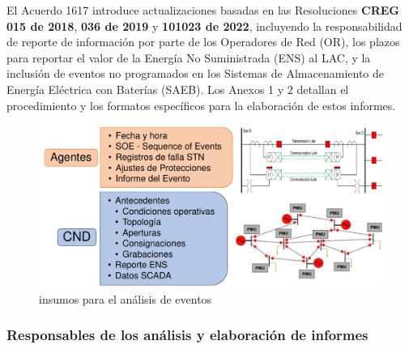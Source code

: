 \documentclass[a5paper]{book}%
\begin{document}
\vspace{0.5cm}

El Acuerdo 1617 introduce actualizaciones basadas en las Resoluciones \textbf{CREG 015 de 2018}, \textbf{036 de 2019} y \textbf{101023 de 2022}, incluyendo la responsabilidad de reporte de información por parte de los Operadores de Red (OR), los plazos para reportar el valor de la Energía No Suministrada (ENS) al LAC, y la inclusión de eventos no programados en los Sistemas de Almacenamiento de Energía Eléctrica con Baterías (SAEB). Los Anexos 1 y 2 detallan el procedimiento y los formatos específicos para la elaboración de estos informes.

\begin{figure}[H]
  \centering
  \caption{insumos para el análisis de eventos}
  \label{fig:insumoseventos}
  \includegraphics[width=0.8\linewidth]{insumos_eventos}
\end{figure}

\subsubsection{Responsables de los análisis y elaboración de informes}
\end{document}
